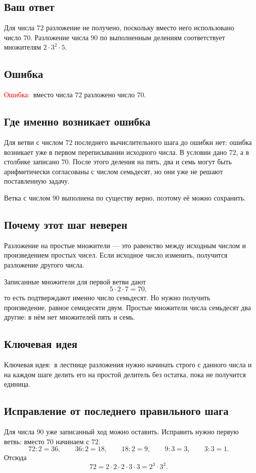 \documentclass[12pt,a4paper]{article}
\newcommand{\ErrorLabel}{\textcolor{red}{Ошибка:}}
\newcommand{\KeyIdea}{\textcolor{blue!60!black}{Ключевая идея:}}
\begin{document}
\subsection*{Ваш ответ}
Для числа $72$ разложение не получено, поскольку вместо него использовано число $70$. Разложение числа $90$ по выполненным делениям соответствует множителям $2\cdot3^2\cdot5$.

\subsection*{Ошибка}
\ErrorLabel\ вместо числа $72$ разложено число $70$.

\subsection*{Где именно возникает ошибка}
Для ветви с числом $72$ последнего вычислительного шага до ошибки нет: ошибка возникает уже в первом переписывании исходного числа. В условии дано $72$, а в столбике записано $70$. После этого деления на пять, два и семь могут быть арифметически согласованы с числом семьдесят, но они уже не решают поставленную задачу.

Ветка с числом $90$ выполнена по существу верно, поэтому её можно сохранить.

\subsection*{Почему этот шаг неверен}
Разложение на простые множители --- это равенство между исходным числом и произведением простых чисел. Если исходное число изменить, получится разложение другого числа.

Записанные множители для первой ветви дают
\[
5\cdot2\cdot7=70,
\]
то есть подтверждают именно число семьдесят. Но нужно получить произведение, равное семидесяти двум. Простые множители числа семьдесят два другие: в нём нет множителей пять и семь.

\subsection*{Ключевая идея}
\KeyIdea\ в лестнице разложения нужно начинать строго с данного числа и на каждом шаге делить его на простой делитель без остатка, пока не получится единица.

\subsection*{Исправление от последнего правильного шага}
Для числа $90$ уже записанный ход можно оставить. Исправить нужно первую ветвь: вместо $70$ начинаем с $72$.
\[
72:2=36,\qquad
36:2=18,\qquad
18:2=9,\qquad
9:3=3,\qquad
3:3=1.
\]
Отсюда
\[
72=2\cdot2\cdot2\cdot3\cdot3=2^3\cdot3^2.
\]
\end{document}
